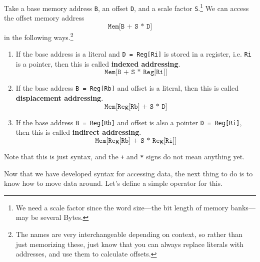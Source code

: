  \begin{definition}
    \label{def:offset-addressing}
    Take a base memory address \texttt{B}, an offset \texttt{D}, and a scale factor \texttt{S}.\footnote{We need a scale factor since the word size---the bit length of memory banks---may be several Bytes.} We can access the offset memory address 
    \begin{equation}
      \texttt{Mem[B + S * D]} 
    \end{equation}
    in the following ways.\footnote{The names are very interchangeable depending on context, so rather than just memorizing these, just know that you can always replace literals with addresses, and use them to calculate offsets.}
    \begin{enumerate}
      \item If the base address is a literal and \texttt{D = Reg[Ri]} is stored in a register, i.e. \texttt{Ri} is a pointer, then this is called \textbf{indexed addressing}. 
        \begin{equation}
          \texttt{Mem[B + S * Reg[Ri]]}
        \end{equation}

      \item If the base address \texttt{B = Reg[Rb]} and offset is a literal, then this is called \textbf{displacement addressing}. 
        \begin{equation}
          \texttt{Mem[Reg[Rb] + S * D]}
        \end{equation}

      \item If the base address \texttt{B = Reg[Rb]} and offset is also a pointer \texttt{D = Reg[Ri]}, then this is called \textbf{indirect addressing}. 
      \begin{equation}
        \texttt{Mem[Reg[Rb] + S * Reg[Ri]]}
      \end{equation}
    \end{enumerate}
  \end{definition}

  Note that this is just syntax, and the \texttt{+} and \texttt{*} signs do not mean anything yet. 

  Now that we have developed syntax for accessing data, the next thing to do is to know how to move data around. Let's define a simple operator for this. 

